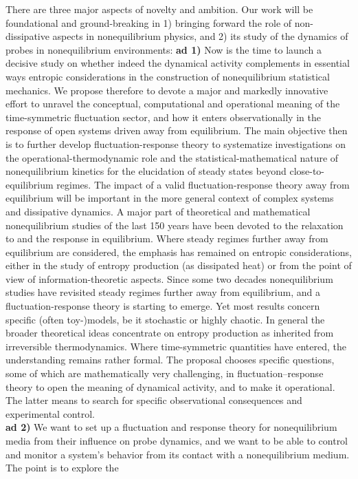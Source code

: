 There are three major aspects of novelty and ambition. Our work will be foundational and ground-breaking in 1) bringing forward the role of non-dissipative aspects in nonequilibrium physics, and 2) its study of the dynamics of probes in nonequilibrium environments: 
%
{\bf ad 1)} Now is the time to launch a decisive study on whether indeed the dynamical
activity complements in essential ways entropic considerations in the construction of
nonequilibrium statistical mechanics. We propose therefore to devote a major and markedly
innovative effort to unravel the conceptual, computational and operational meaning of the
time-symmetric fluctuation sector, and how it enters observationally in the response of open
systems driven away from equilibrium.  The main objective
then is to further develop fluctuation-response theory to systematize investigations on the
operational-thermodynamic role and the statistical-mathematical nature of nonequilibrium
kinetics for the elucidation of steady states beyond close-to-equilibrium regimes. The
impact of a valid fluctuation-response theory away from equilibrium will be important in the
more general context of complex systems and dissipative dynamics.
%
A major part of theoretical and mathematical nonequilibrium studies of the last 150 years
have been devoted to the relaxation to and the response in equilibrium. Where steady regimes
further away from equilibrium are considered, the emphasis has remained on entropic
considerations, either in the study of entropy production (as dissipated heat) or from the
point of view of information-theoretic aspects.  Since some two decades nonequilibrium
studies have revisited steady regimes further away from equilibrium, and a
fluctuation-response theory is starting to emerge. Yet most results concern specific (often
toy-)models, be it stochastic or highly chaotic. In general the broader theoretical ideas
concentrate on entropy production as inherited from irreversible thermodynamics. Where
time-symmetric quantities have entered, the understanding remains rather formal.  The proposal chooses specific questions, some of which are mathematically very challenging, in fluctuation–response theory to open the meaning of dynamical activity, and to make it operational. The latter means to search for specific observational consequences and experimental control.\\
%
{\bf ad 2)} We want to set up a fluctuation and response theory for nonequilibrium media
from their influence on probe dynamics, and we want to be able to control and monitor a
system’s behavior from its contact with a nonequilibrium medium. The point is to explore the
